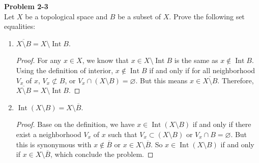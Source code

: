 \documentclass[12pt, a4paper]{article}
\theoremstyle{plain}
\DeclareMathOperator{\inter}{Int}
\newenvironment{problem}[2][Problem]
    { \begin{mdframed}[backgroundcolor=gray!20] \textbf{#1 #2} \\}
    {  \end{mdframed}}
\begin{document}
\begin{problem}{2-3}
Let $X$ be a topological space and $B$ be a subset of $X$. Prove the following set equalities:
\begin{enumerate}[label=(\alph*)]
\item $\overline{X\setminus B}=X\setminus \inter{B}$.
	\begin{proof}
	For any $x\in X$, we know that $x\in X\setminus\inter{B}$ is the same as $x\notin \inter{B}$. Using the definition of interior, $x\notin \inter{B}$ if and only if for all neighborhood $V_x$ of $x$, $V_x\not\subset B$, or $V_x\cap (X\setminus B)=\varnothing$. But this means $x\in\overline{X\setminus B}$. Therefore, $\overline{X\setminus B}=X\setminus \inter{B}$.
	\end{proof}
\item $\inter{(X\setminus B)}=X\setminus\overline{B}$.
	\begin{proof}
	Base on the definition, we have $x\in \inter{(X\setminus B)}$ if and only if there exist a neighborhood $V_x$ of $x$ such that $V_x\subset (X\setminus B)$ or $V_x\cap B=\varnothing$. But this is synonymous with $x\notin \overline{B}$ or $x\in X\setminus\overline{B}$. So $x\in\inter{(X\setminus B)}$ if and only if $x\in X\setminus\overline{B}$, which conclude the problem.
	\end{proof}

\end{enumerate}
\end{problem}
\end{document}

